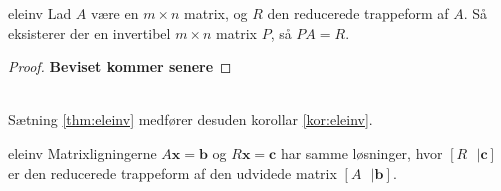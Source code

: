 %
%
\begin{thm}{}{eleinv}
Lad $A$ være en $m \times n$ matrix, og $R$ den reducerede trappeform af $A$. 
Så eksisterer der en invertibel $m \times n$ matrix $P$, så $PA=R$.
\end{thm}
%
\begin{proof}
\textbf{Beviset kommer senere }
\end{proof}
%
\\
Sætning \ref{thm:eleinv} medfører desuden korollar \ref{kor:eleinv}.
\begin{kor}{}{eleinv}
Matrixligningerne $A\textbf{x}=\textbf{b}$ og $R\textbf{x}=\textbf{c}$ har samme løsninger, hvor 
$[R \text{   }| \textbf{c}]$
er den reducerede trappeform af den udvidede matrix 
$[A \text{   }| \textbf{b}].
$
\end{kor}
%
